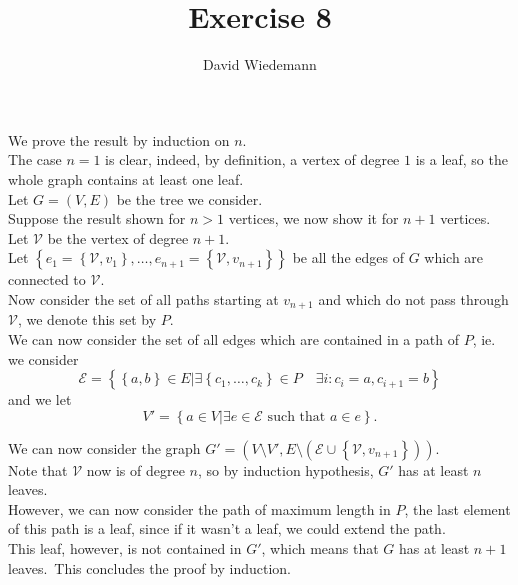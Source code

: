 \documentclass[11pt, a4paper]{article}
\begin{document}
\title{Exercise 8}
\author{David Wiedemann}
\maketitle
We prove the result by induction on $n$.\\
The case $n=1$ is clear, indeed, by definition, a vertex of degree $1$ is a leaf, so the whole graph contains at least one leaf.\\
Let $G= ( V ,E) $ be the tree we consider.\\
Suppose the result shown for $n > 1$ vertices, we now show it for $n+1$ vertices.\\
Let $\mathcal{V}$ be the vertex of degree $n+1$.\\
Let $ \left\{ e_1= \left\{ \mathcal{V},v_1 \right\}  , \ldots,e_{n+1} = \left\{ \mathcal{V}, v_{n+1}  \right\}   \right\} $ be all the edges of $G$ which are connected to $ \mathcal{V}$. \\
Now consider the set of all paths starting at $v_{n+1} $ and which do not pass through $ \mathcal{V}$, we denote this set by $P$.\\
We can now consider the set of all edges which are contained in a path of $P$, ie. we consider 
\[ 
\mathcal{E} = \left\{ \left\{ a,b \right\} \in E | \exists \left\{ c_1, \ldots, c_{k}  \right\}\in P\quad \exists i : c_{i} =a, c_{i+1} =b   \right\} 
\]
and we let
\[ 
V' = \left\{ a \in V | \exists e \in \mathcal{E} \text{ such that } a \in e \right\} 
.\]

We can now consider the graph $G' = (  V\setminus V', E \setminus ( \mathcal{E} \cup \left\{ \mathcal{V}, v_{n+1}  \right\} ) )$.\\
Note that $\mathcal{V}$ now is of degree $n$, so by induction hypothesis, $G'$ has at least $n$ leaves.\\
However, we can now consider the path of maximum length in $P$, the last element of this path is a leaf, since if it wasn't a leaf, we could extend the path.\\
This leaf, however, is not contained in $G'$, which means that $G$ has at least $n+1$ leaves.\
This concludes the proof by induction.
\end{document}
